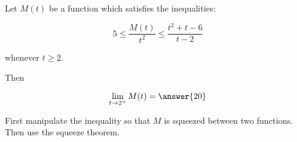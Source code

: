 \documentclass{ximera}
\author{Steven Gubkin}
\begin{document}
\begin{exercise}


	Let $M(t)$ be a function which satisfies the inequalities:
	
	\[
		5 \leq \frac{M(t)}{t^2} \leq  \frac{t^2+t-6}{t-2} 
	\]
	
	whenever $t \geq 2$.
	
	Then 
	
	\[
	\lim_{t \to 2^+} M(t)  =  \answer{20}
	\]
	
	\begin{hint}
		First manipulate the inequality so that $M$ is squeezed between two functions.  Then use the squeeze theorem.
	\end{hint}

\end{exercise}
\end{document}
